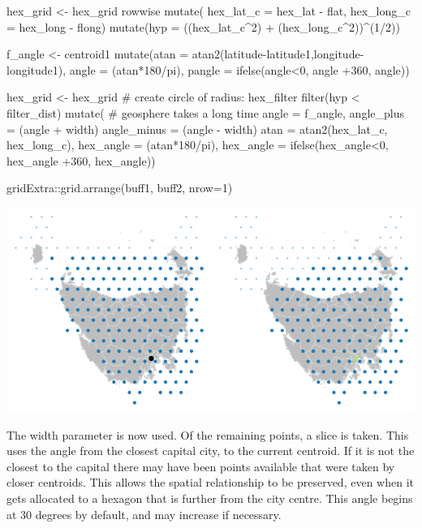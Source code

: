 \begin{Schunk}
\begin{Sinput}
    hex_grid <- hex_grid %
        rowwise %
        mutate(
        hex_lat_c = hex_lat - flat,
        hex_long_c = hex_long - flong) %
        mutate(hyp = ((hex_lat_c^2) + (hex_long_c^2))^(1/2))


        f_angle <- centroid1 %
            mutate(atan = atan2(latitude-latitude1,longitude-longitude1),
                angle = (atan*180/pi),
                pangle = ifelse(angle<0, angle +360, angle)) %


        hex_grid <- hex_grid %
            # create circle of radius: hex_filter
            filter(hyp < filter_dist) %
            mutate(
                # geosphere takes a long time
                angle = f_angle,
                angle_plus = (angle + width)%
                angle_minus = (angle - width)%
                atan = atan2(hex_lat_c, hex_long_c),
                hex_angle = (atan*180/pi),
                hex_angle = ifelse(hex_angle<0, hex_angle +360, hex_angle))
\end{Sinput}
\end{Schunk}

\begin{Schunk}
\begin{Sinput}
gridExtra::grid.arrange(buff1, buff2, nrow=1)
\end{Sinput}

\includegraphics{algorithmRjournal_files/figure-latex/buffers-1} \end{Schunk}

The width parameter is now used. Of the remaining points, a slice is
taken. This uses the angle from the closest capital city, to the current
centroid. If it is not the closest to the capital there may have been
points available that were taken by closer centroids. This allows the
spatial relationship to be preserved, even when it gets allocated to a
hexagon that is further from the city centre. This angle begins at 30
degrees by default, and may increase if necessary.

